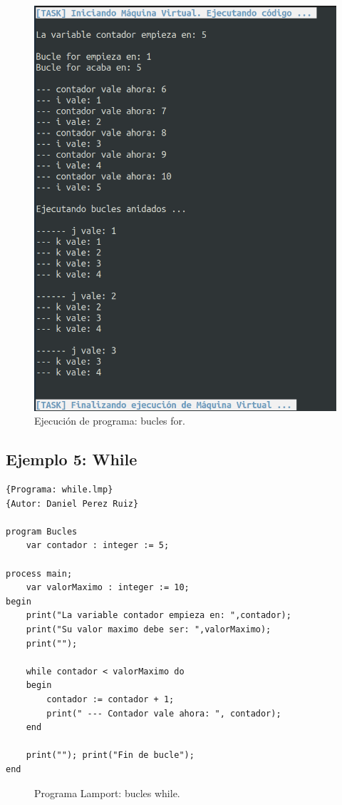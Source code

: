 \newpage
\begin{figure}[!h]
    \includegraphics[scale=0.5]{images/ejemplos/for.png}
    \caption{Ejecución de programa: bucles for.}
    \label{fig:lamportFor_exec}
\end{figure}

\newpage
\subsection{Ejemplo 5: While}
\begin{lstlisting}[style=lamportStyle]
{Programa: while.lmp}
{Autor: Daniel Perez Ruiz}

program Bucles
	var contador : integer := 5;

process main;
	var valorMaximo : integer := 10;
begin
	print("La variable contador empieza en: ",contador);
	print("Su valor maximo debe ser: ",valorMaximo);
	print("");
	
	while contador < valorMaximo do
	begin
		contador := contador + 1;
		print(" --- Contador vale ahora: ", contador);
	end
	
	print(""); print("Fin de bucle");
end
\end{lstlisting}
\begin{figure}[h]
\caption{Programa Lamport: bucles while.}
\label{fig:lamportWhile}
\end{figure}

